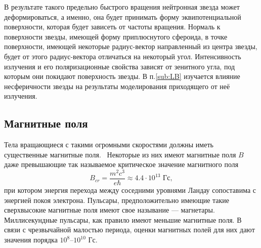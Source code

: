 \documentclass[14pt,a4paper]{extarticle}
\newcommand{\be}{\begin{equation}}
\newcommand{\ee}{\end{equation}}
\begin{document}
			В результате такого предельно быстрого вращения нейтронная звезда может деформироваться, а именно, она будет принимать форму эквипотенциальной поверхности, которая будет зависеть от частоты вращения. 
			Нормаль к поверхности звезды, имеющей форму приплюснутого сфероида, в точке поверхности, имеющей некоторые радиус-вектор направленный из центра звезды, будет от этого радиус-вектора отличаться на некоторый угол.
			Интенсивность излучения и его поляризационные свойства зависят от зенитного угла, под которым они покидают поверхность звезды. 
			В п.\ref{sub:LB} изучается влияние несферичности звезды на результаты моделирования приходящего от неё излучения. 



		
		\subsection{Магнитные поля} %
		\label{sub:MF}
		
			Тела вращающиеся с такими огромными скоростями должны иметь существенные магнитные поля. 
			\
			Некоторые из них имеют магнитные поля $B$ даже превышающие так называемое критическое значение магнитного поля 
			\be\label{eq:Bcr}
			B_{cr}=\frac{m^2c^3}{e\hbar} \approx 4.4\cdot10^{13} \text{ Гс},\ee
			при котором энергия перехода между соседними уровнями Ландау сопоставима с энергией покоя электрона. 
			Пульсары, предположительно имеющие такие сверхвысокие магнитные поля имеют свое называние --- магнетары. 
			Миллисекундные пульсары, как правило имеют меньшие магнитные поля. 
			В связи с чрезвычайной малостью периода, оценки магнитных полей для них дают значения порядка $10^8 \text{--}10^{10}$ Гс.
\end{document}
